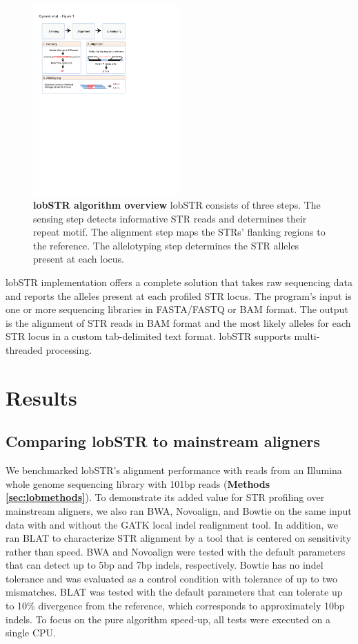 \begin{figure}[h!]
\centering
\label{fig:lobfig1}
\includegraphics[width=0.5\textwidth]{Figures/Chapter2/Fig1.pdf}
\caption{\textbf{lobSTR algorithm overview} lobSTR consists of three steps. The sensing step detects informative STR reads and determines their repeat motif. The alignment step maps the STRs' flanking regions to the reference. The allelotyping step determines the STR alleles present at each locus.}
\end{figure}

lobSTR implementation offers a complete solution that takes raw sequencing data and reports the alleles present at each profiled STR locus. The program's input is one or more sequencing libraries in FASTA/FASTQ or BAM format. The output is the alignment of STR reads in BAM format and the most likely alleles for each STR locus in a custom tab-delimited text format. lobSTR supports multi-threaded processing.

\section{Results}
\subsection{Comparing lobSTR to mainstream aligners}

We benchmarked lobSTR's alignment performance with reads from an Illumina whole genome sequencing library with 101bp reads (\textbf{Methods \ref{sec:lobmethods}}). To demonstrate its added value for STR profiling over mainstream aligners, we also ran BWA, Novoalign, and Bowtie on the same input data with and without the GATK local indel realignment tool. In addition, we ran BLAT \cite{Kent2002} to characterize STR alignment by a tool that is centered on sensitivity rather than speed. BWA and Novoalign were tested with the default parameters that can detect up to 5bp and 7bp indels, respectively. Bowtie has no indel tolerance and was evaluated as a control condition with tolerance of up to two mismatches. BLAT was tested with the default parameters that can tolerate up to 10\% divergence from the reference, which corresponds to approximately 10bp indels. To focus on the pure algorithm speed-up, all tests were executed on a single CPU.


